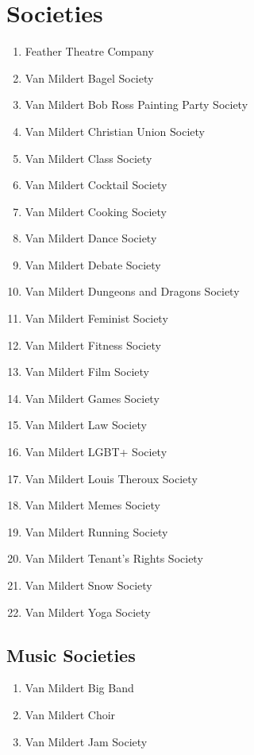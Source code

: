 \documentclass[12pt]{article}  %
\begin{document}
\section{Societies}
\begin{enumerate}[]
    \item Feather Theatre Company
    \item Van Mildert Bagel Society
    \item Van Mildert Bob Ross Painting Party Society
    \item Van Mildert Christian Union Society
    \item Van Mildert Class Society
    \item Van Mildert Cocktail Society
    \item Van Mildert Cooking Society
    \item Van Mildert Dance Society
    \item Van Mildert Debate Society
    \item Van Mildert Dungeons and Dragons Society
    \item Van Mildert Feminist Society
    \item Van Mildert Fitness Society
    \item Van Mildert Film Society
    \item Van Mildert Games Society
    \item Van Mildert Law Society
    \item Van Mildert LGBT+ Society
    \item Van Mildert Louis Theroux Society
    \item Van Mildert Memes Society
    \item Van Mildert Running Society
    \item Van Mildert Tenant's Rights Society
    \item Van Mildert Snow Society
    \item Van Mildert Yoga Society
\end{enumerate}
\subsection{Music Societies}
\begin{enumerate}[]
    \item Van Mildert Big Band
    \item Van Mildert Choir
    \item Van Mildert Jam Society
\end{enumerate}
\end{document}

